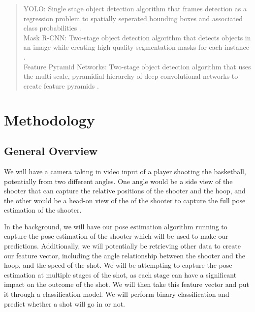 \documentclass[10pt,twocolumn,letterpaper]{article}
\begin{document}
\begin{quotation}
  YOLO: Single stage object detection algorithm that frames detection as a regression problem to spatially seperated bounding boxes and associated class probabilities \cite{YOLO}.\\
  \newline
  \indent Mask R-CNN: Two-stage object detection algorithm that detects objects in an image while creating high-quality segmentation masks for each instance \cite{PatternRec}.\\
  \newline
  \indent Feature Pyramid Networks: Two-stage object detection algorithm that uses the multi-scale, pyramidial hierarchy of deep convolutional networks to create feature pyramids \cite{FeaturePyr}. \\
\end{quotation}

\section{Methodology}
\subsection{General Overview}
We will have a camera taking in video input of a player shooting the basketball, potentially from two different angles.
One angle would be a side view of the shooter that can capture the relative positions of the shooter and the hoop, and the other
would be a head-on view of the of the shooter to capture the full pose estimation of the shooter.

In the background, we will have our pose estimation algorithm running to capture the pose estimation of the shooter which will be used
to make our predictions. Additionally, we will potentially be retrieving other data to create our feature vector, including the angle relationship
between the shooter and the hoop, and the speed of the shot. We will be attempting to capture the pose estimation at multiple stages of the
shot, as each stage can have a significant impact on the outcome of the shot. We will then take this feature vector and put it through a classification model.
We will perform binary classification and predict whether a shot will go in or not.
\end{document}
